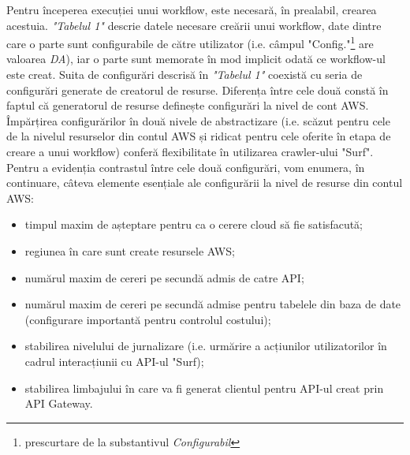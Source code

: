 Pentru începerea execuției unui workflow, este necesară, în prealabil, crearea acestuia. \textit{"Tabelul 1"} descrie datele necesare creării unui workflow, date dintre care o parte sunt configurabile de către utilizator (i.e. câmpul "Config."\footnote{prescurtare de la substantivul \textit{Configurabil}} are valoarea \textit{DA}), iar o parte sunt memorate în mod implicit odată ce workflow-ul este creat. Suita de configurări descrisă în \textit{"Tabelul 1"} coexistă cu seria de configurări generate de creatorul de resurse. Diferența între cele două constă în faptul că generatorul de resurse definește configurări la nivel de cont AWS. Împărțirea configurărilor în două nivele de abstractizare (i.e. scăzut pentru cele de la nivelul resurselor din contul AWS și ridicat pentru cele oferite în etapa de creare a unui workflow) conferă flexibilitate în utilizarea crawler-ului "Surf". Pentru a evidenția contrastul între cele două configurări, vom enumera, în continuare, câteva elemente esențiale ale configurării la nivel de resurse din contul AWS:

\begin{itemize}
	\item{timpul maxim de așteptare pentru ca o cerere cloud să fie satisfacută;}
	\item{regiunea în care sunt create resursele AWS;}
	\item{numărul maxim de cereri pe secundă admis de catre API;}
	\item{numărul maxim de cereri pe secundă admise pentru tabelele din baza de date (configurare importantă pentru controlul costului);}
	\item{stabilirea nivelului de jurnalizare (i.e. urmărire a acțiunilor utilizatorilor în cadrul interacțiunii cu API-ul "Surf);}
	\item{stabilirea limbajului în care va fi generat clientul pentru API-ul creat prin API Gateway.}

\end{itemize}

